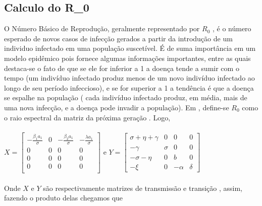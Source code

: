 \documentclass[12pt,a4paper]{article}
\begin{document}
\subsection*{Calculo do R_0}
O Número Básico de Reprodução, geralmente representado por $R_0$ , é o número esperado de novos
casos de infecção gerados a partir da introdução de um individuo infectado em uma população
suscetível. É de suma importância em um modelo epidêmico pois fornece algumas informações
importantes, entre as quais destaca-se o fato de que se ele for inferior a 1 a doença tende a sumir
com o tempo (um indivíduo infectado produz menos de um novo indivíduo infectado ao longo de seu período infeccioso), e se for superior a 1 a tendência é que a doença se espalhe na população ( cada indivíduo infectado produz, em média, mais de uma nova infecção, e a doença pode invadir a população). Em \cite{R0}, define-se $R_0$  como o raio espectral da matriz da próxima geração
. Logo, \\ \vspace{6} \\
 $X = \begin{bmatrix}
- \frac{\beta_1 a_1}{\sigma} & 0 & - \frac{\beta_2 a_1}{\sigma} & - \frac{\lambda a_1}{\sigma} \\
0 & 0 & 0 & 0 \\
0 & 0 & 0 & 0 \\
0 & 0 & 0 & 0 \\
\end{bmatrix}$ e $Y = \begin{bmatrix}
\sigma + \eta + \gamma & 0 & 0 & 0\\
- \gamma & \sigma & 0 & 0\\
- \sigma - \eta & 0 & b & 0\\
- \xi  & 0 & - \alpha & \delta
\end{bmatrix}$ \\ \vspace{3} \\Onde $X$ e $Y$ são respectivamente matrizes de transmissão e transição , assim, fazendo o produto delas chegamos que\vspace{2mm}\\
\end{document}
